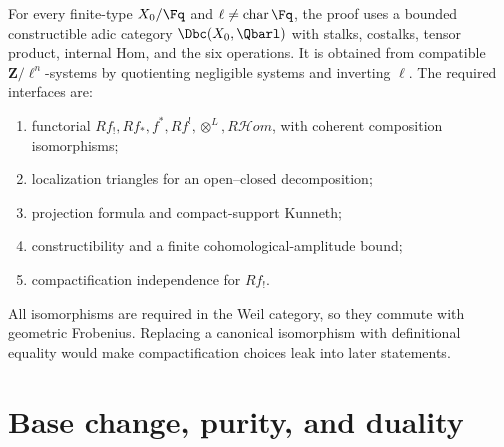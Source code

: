 For every finite-type \(X_0/\Fq\) and \(\ell\ne\operatorname{char}\Fq\), the
proof uses a bounded constructible adic category
\(\Dbc(X_0,\Qbarl)\) with stalks, costalks, tensor product, internal Hom, and
the six operations.  It is obtained from compatible
\(\mathbf Z/\ell^n\)-systems by quotienting negligible systems and inverting
\(\ell\).  The required interfaces are:

\begin{enumerate}
\item functorial \(Rf_!,Rf_*,f^*,Rf^!,\otimes^L,R\mathcal Hom\), with coherent
      composition isomorphisms;
\item localization triangles for an open--closed decomposition;
\item projection formula and compact-support Kunneth;
\item constructibility and a finite cohomological-amplitude bound;
\item compactification independence for \(Rf_!\).
\end{enumerate}

All isomorphisms are required in the Weil category, so they commute with
geometric Frobenius.  Replacing a canonical isomorphism with definitional
equality would make compactification choices leak into later statements.

\section{Base change, purity, and duality}

